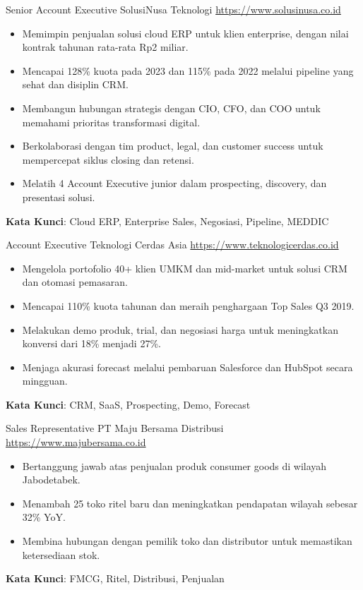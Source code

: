 \documentclass[a4paper, serif, 10pt]{moderncv}
\begin{document}
        {Senior Account Executive}
        {SolusiNusa Teknologi}
        {\url{https://www.solusinusa.co.id}}
        {}
        {\begin{itemize}
\item Memimpin penjualan solusi cloud ERP untuk klien enterprise, dengan nilai kontrak tahunan rata-rata Rp2 miliar.
\item Mencapai 128\% kuota pada 2023 dan 115\% pada 2022 melalui pipeline yang sehat dan disiplin CRM.
\item Membangun hubungan strategis dengan CIO, CFO, dan COO untuk memahami prioritas transformasi digital.
\item Berkolaborasi dengan tim product, legal, dan customer success untuk mempercepat siklus closing dan retensi.
\item Melatih 4 Account Executive junior dalam prospecting, discovery, dan presentasi solusi.
\end{itemize}
\textbf{Kata Kunci}: Cloud ERP, Enterprise Sales, Negosiasi, Pipeline, MEDDIC}

        {Account Executive}
        {Teknologi Cerdas Asia}
        {\url{https://www.teknologicerdas.co.id}}
        {}
        {\begin{itemize}
\item Mengelola portofolio 40+ klien UMKM dan mid-market untuk solusi CRM dan otomasi pemasaran.
\item Mencapai 110\% kuota tahunan dan meraih penghargaan Top Sales Q3 2019.
\item Melakukan demo produk, trial, dan negosiasi harga untuk meningkatkan konversi dari 18\% menjadi 27\%.
\item Menjaga akurasi forecast melalui pembaruan Salesforce dan HubSpot secara mingguan.
\end{itemize}
\textbf{Kata Kunci}: CRM, SaaS, Prospecting, Demo, Forecast}

        {Sales Representative}
        {PT Maju Bersama Distribusi}
        {\url{https://www.majubersama.co.id}}
        {}
        {\begin{itemize}
\item Bertanggung jawab atas penjualan produk consumer goods di wilayah Jabodetabek.
\item Menambah 25 toko ritel baru dan meningkatkan pendapatan wilayah sebesar 32\% YoY.
\item Membina hubungan dengan pemilik toko dan distributor untuk memastikan ketersediaan stok.
\end{itemize}
\textbf{Kata Kunci}: FMCG, Ritel, Distribusi, Penjualan}
\end{document}
